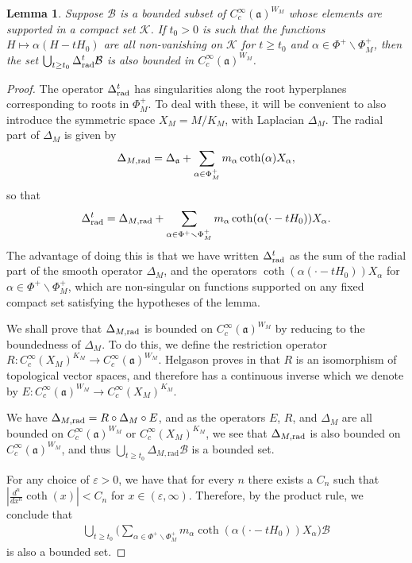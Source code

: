 \documentclass[12pt]{amsart}
\newtheorem{lemma}[theorem]{Lemma}
\theoremstyle{remark}
\newcommand{\ga}{\mathfrak a}
\begin{document}
\begin{lemma}
    Suppose $\mathcal{B}$ is a bounded subset of $C_c^\infty(\mathfrak{a})^{W_M}$ whose elements are supported in a compact set $\mathcal{K}$. If $t_0 > 0$ is such that the functions $H \mapsto \alpha(H - t H_0)$ are all non-vanishing on $\mathcal{K}$ for $t \geq t_0$ and $\alpha \in \Phi^+ \smallsetminus \Phi^+_M$, then the set $\bigcup_{t \geq t_0} \Delta^t_{\textnormal{rad}} \mathcal{B}$ is also bounded in $C_c^\infty(\mathfrak{a})^{W_M}$.
\end{lemma}
\begin{proof}
The operator $\Delta_{\rm rad}^t$ has singularities along the root hyperplanes corresponding to roots in $\Phi^+_M$.  To deal with these, it will be convenient to also introduce the symmetric space $X_M = M / K_M$, with Laplacian $\Delta_M$.  The radial part of $\Delta_M$ is given by
\[
\Delta_{M, \rm rad} = \Delta_{\ga} + \sum_{\alpha \in \Phi^+_{M}} m_\alpha \coth( \alpha) X_\alpha,
\]
so that
\[
\Delta_{\rm rad}^t = \Delta_{M, \rm rad} + \sum_{\alpha \in \Phi^+ \smallsetminus \Phi_{M}^{+} } m_\alpha \coth( \alpha( \cdot - tH_0) ) X_\alpha.
\]
The advantage of doing this is that we have written $\Delta_{\rm rad}^t$ as the sum of the radial part of the smooth operator $\Delta_M$, and the operators $\coth( \alpha( \cdot - tH_0) ) X_\alpha$ for $\alpha \in \Phi^+ \smallsetminus \Phi^{+}_{M}$, which are non-singular on functions supported on any fixed compact set satisfying the hypotheses of the lemma.

We shall prove that $\Delta_{M, \rm rad}$ is bounded on $C^\infty_c(\mathfrak{a})^{W_M}$ by reducing to the boundedness of $\Delta_M$. To do this, we define the restriction operator $R : C^\infty_c(X_M)^{K_M} \to C^\infty_c(\mathfrak{a})^{W_M}$.  Helgason proves in \cite[Ch. II, \S 5, Th. 5.8]{Helgason_00} that $R$ is an isomorphism of topological vector spaces, and therefore has a continuous inverse which we denote by $E : C^\infty_c(\mathfrak{a})^{W_M} \to C^\infty_c(X_M)^{K_M}$. 

We have $\Delta_{M, \rm rad} = R \circ \Delta_M \circ E$, and as the operators $E$, $R$, and $\Delta_M$ are all bounded on $C^\infty_c(\ga)^{W_M}$ or $C^\infty_c(X_M)^{K_M}$, we see that $\Delta_{M, \rm rad}$ is also bounded on $C^\infty_c(\ga)^{W_M}$, and thus $\bigcup_{t \geq t_0} \Delta_{M, \text{rad}} \mathcal{B}$ is a bounded set.

For any choice of $\varepsilon > 0$, we have that for every $n$ there exists a $C_n$ such that $|\frac{d^n}{d x^n} \coth(x)| < C_n$ for $x \in (\varepsilon, \infty)$. Therefore, by the product rule, we conclude that
\begin{gather*}
    \bigcup_{t \geq t_0} \Big(\sum_{\alpha \in \Phi^+ \smallsetminus \Phi^+_{M}} m_{\alpha} \coth(\alpha (\cdot - t H_0)) X_\alpha \Big) \mathcal{B}
\end{gather*}
is also a bounded set. 
\end{proof}
\end{document}
